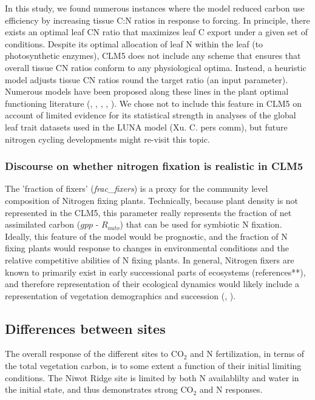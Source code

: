 \documentclass[draft,linenumbers]{agujournal}
\begin{document}
In this study, we found numerous instances where the model reduced carbon use efficiency by increasing tissue C:N ratios in response to forcing. In principle, there exists an optimal leaf CN ratio that maximizes leaf C export under a given set of conditions. Despite its optimal allocation of leaf N within the leaf (to photosynthetic enzymes), CLM5 does not include any scheme that ensures that overall tissue CN ratios conform to any physiological optima. Instead, a heuristic model adjusts tissue CN ratios round the target ratio (an input parameter).  Numerous models have been proposed along these lines in the plant optimal functioning literature (\cite{vanwijk2003}, \cite{mcmurtrie2011}, \cite{a,nten2011} \cite{franklin2012}, \cite{mcmurtrie2013}, \cite{thomas2014}). We chose not to include this feature in CLM5 on account of limited evidence for its statistical strength in analyses of the global leaf trait datasets used in the LUNA model (Xu. C. pers comm), but future nitrogen cycling developments might re-visit this topic. 


\subsubsection{Discourse on whether nitrogen fixation is realistic in CLM5}
The 'fraction of fixers' (\emph{frac\_fixers}) is a proxy for the community level composition of Nitrogen fixing plants. Technically, because plant density is not represented in the CLM5, this parameter really represents the fraction of net assimilated carbon ($gpp$ - $R_{auto}$) that can be used for symbiotic N fixation. Ideally, this feature of the model would be prognostic, and the fraction of N fixing plants would response to changes in environmental conditions and the relative competitive abilities of N fixing plants. In general, Nitrogen fixers are known to primarily exist in early successional parts of ecosystems (references**), and therefore representation of their ecological dynamics would likely include a representation of vegetation demographics and succession (\cite{fisher2018vegetation}, \cite{trugman2016climate}).

\subsection{Differences between sites}
The overall response of the different sites to CO$_{2}$ and N fertilization, in terms of the total vegetation carbon, is to some extent a function of their initial limiting conditions.  The Niwot Ridge site is limited by both N availablilty and water in the initial state, and thus demonstrates strong CO$_{2}$ and N responses. 
\end{document}
